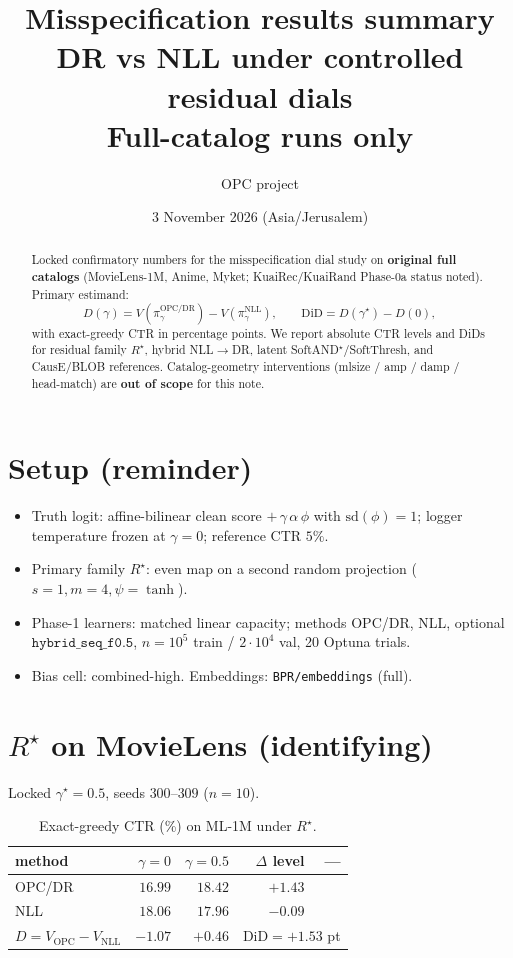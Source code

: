 \documentclass[11pt,a4paper]{article}
\title{\textbf{Misspecification results summary}\\
\large DR vs NLL under controlled residual dials\\
\normalsize Full-catalog runs only}
\author{OPC project}
\date{3 November 2026 (Asia/Jerusalem)}
\newcommand{\Rstar}{R^{\star}}
\newcommand{\gstar}{\gamma^{\star}}
\newcommand{\DiD}{\mathrm{DiD}}
\begin{document}
\maketitle

\begin{abstract}
\noindent
Locked confirmatory numbers for the misspecification dial study on \textbf{original full catalogs}
(MovieLens-1M, Anime, Myket; KuaiRec/KuaiRand Phase-0a status noted).
Primary estimand:
\[
D(\gamma)=V(\pi^{\mathrm{OPC/DR}}_{\gamma})-V(\pi^{\mathrm{NLL}}_{\gamma}),
\qquad
\DiD=D(\gstar)-D(0),
\]
with exact-greedy CTR in percentage points.
We report absolute CTR levels and DiDs for residual family \(\Rstar\), hybrid NLL\(\to\)DR,
latent SoftAND\(^\star\)/SoftThresh, and CausE/BLOB references.
Catalog-geometry interventions (mlsize / amp / damp / head-match) are \textbf{out of scope}
for this note.
\end{abstract}

\section{Setup (reminder)}
\begin{itemize}[leftmargin=1.2em,itemsep=0.2em]
  \item Truth logit: affine-bilinear clean score \(+\,\gamma\,\alpha\,\phi\) with \(\mathrm{sd}(\phi)=1\);
        logger temperature frozen at \(\gamma=0\); reference CTR \(5\%\).
  \item Primary family \(\Rstar\): even map on a second random projection
        (\(s{=}1,m{=}4,\psi{=}\tanh\)).
  \item Phase-1 learners: matched linear capacity; methods OPC/DR, NLL, optional
        \(\texttt{hybrid\_seq\_f0.5}\), \(n{=}10^5\) train / \(2{\cdot}10^4\) val, 20 Optuna trials.
  \item Bias cell: combined-high. Embeddings: \texttt{BPR/embeddings} (full).
\end{itemize}

\section{\texorpdfstring{$\Rstar$}{R*} on MovieLens (identifying)}
Locked \(\gstar{=}0.5\), seeds \(300\)--\(309\) (\(n{=}10\)).

\begin{table}[h]
\centering
\caption{Exact-greedy CTR (\%) on ML-1M under \(\Rstar\).}
\begin{tabular}{lrrrr}
\toprule
method & \(\gamma{=}0\) & \(\gamma{=}0.5\) & \(\Delta\) level & --- \\
\midrule
OPC/DR & \(16.99\) & \(18.42\) & \(+1.43\) & \\
NLL    & \(18.06\) & \(17.96\) & \(-0.09\) & \\
\midrule
\(D{=}V_{\mathrm{OPC}}-V_{\mathrm{NLL}}\) & \(-1.07\) & \(+0.46\) &
\multicolumn{2}{l}{\(\DiD{=}\mathbf{+1.53}\) pt} \\
\bottomrule
\end{tabular}
\end{table}
\end{document}
